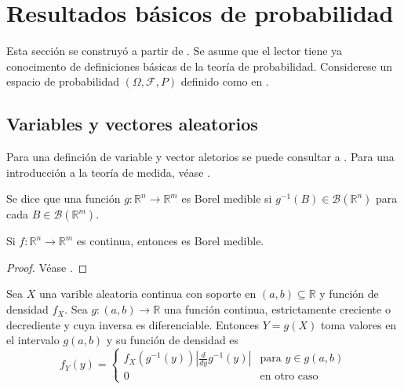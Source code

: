 \section{Resultados básicos de probabilidad}

Esta sección se construyó a partir de  
\cite{billingsleyProbabilityMeasure1995,
rinconCursoIntermedioProbabilidad2007,
mardiaMultivariateAnalysis1979}. Se asume que el 
lector tiene ya conocimento de definiciones básicas de 
la teoría de probabilidad.
Considerese un espacio de probabilidad $(\Omega,
\mathcal F, P)$ definido como en 
\cite{rinconCursoIntermedioProbabilidad2007}. 


\subsection{Variables y vectores aleatorios} 

Para una definción de variable y vector aletorios se puede 
consultar a \cite{rinconCursoIntermedioProbabilidad2007}. 
Para una introducción a la teoría de medida, véase 
\cite{billingsleyProbabilityMeasure1995}.

\begin{definition}
    Se dice que una función $g:\mathbb R^n\to \mathbb R^m$  
    es Borel medible si $g^{-1}(B)\in \mathcal B(\mathbb R^n)$ para 
    cada $B\in \mathcal B(\mathbb R^m)$.
\end{definition}

\begin{proposition}
    Si $f:\mathbb R^n\to \mathbb R^m$ es continua, entonces es
    Borel medible.
\end{proposition}

\begin{proof}
    Véase \cite{billingsleyProbabilityMeasure1995}.
\end{proof}

\begin{theorem}
    Sea $X$ una varible aleatoria continua con soporte en 
    $(a,b)\subseteq \mathbb R$ y función de densidad $f_X$. Sea 
    $g:(a,b)\to \mathbb R$ una función continua, estrictamente 
    creciente o decrediente y cuya inversa es diferenciable. 
    Entonces $Y=g(X)$ toma valores en el intervalo $g(a,b)$ y 
    su función de densidad es 
    $$f_Y(y) = 
    \begin{cases}
    f_X(g^{-1}(y))\left|\frac{d}{dy}g^{-1}(y)\right| & \text{para } y\in g(a,b)\\
    0 & \text{en otro caso}
    \end{cases}$$
\end{theorem}


